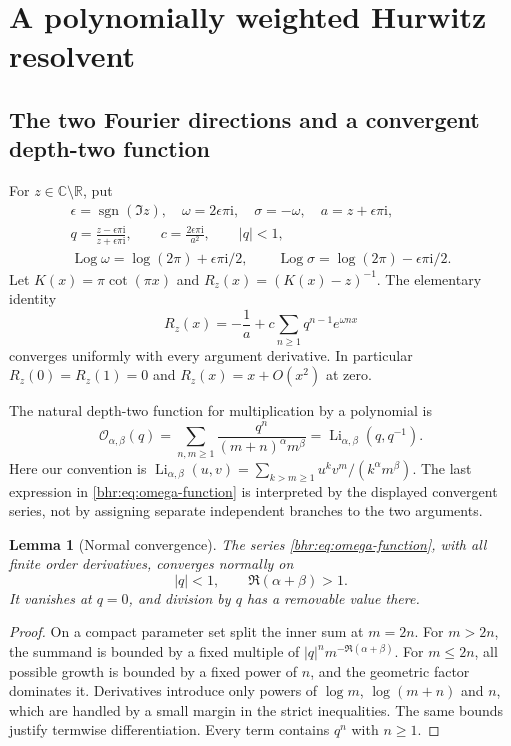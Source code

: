 \documentclass[11pt]{article}
\numberwithin{equation}{section}
\theoremstyle{plain}
\newtheorem{lemma}[theorem]{Lemma}
\theoremstyle{definition}
\theoremstyle{remark}
\DeclareMathOperator{\Li}{Li}
\DeclareMathOperator{\Log}{Log}
\DeclareMathOperator{\sgn}{sgn}
\newcommand{\C}{\mathbb C}
\newcommand{\R}{\mathbb R}
\newcommand{\ii}{\mathrm i}
\begin{document}


\section{A polynomially weighted Hurwitz resolvent}
\label{bhr:sec:weighted}

\subsection{The two Fourier directions and a convergent depth-two function}

For $z\in\C\setminus\R$, put
\begin{equation}\label{bhr:eq:coordinates}
 \begin{gathered}
 \epsilon=\sgn(\Im z),\quad \omega=2\epsilon\pi\ii,
 \quad \sigma=-\omega,\quad a=z+\epsilon\pi\ii,\\
 q=\frac{z-\epsilon\pi\ii}{z+\epsilon\pi\ii},\qquad
 c=\frac{2\epsilon\pi\ii}{a^2},\qquad |q|<1,\\
 \Log\omega=\log(2\pi)+\epsilon\pi\ii/2,\qquad
 \Log\sigma=\log(2\pi)-\epsilon\pi\ii/2.
 \end{gathered}
\end{equation}
Let $K(x)=\pi\cot(\pi x)$ and $R_z(x)=(K(x)-z)^{-1}$.
The elementary identity
\begin{equation}\label{bhr:eq:resolvent-fourier}
 R_z(x)=-\frac1a+c\sum_{n\ge1}q^{n-1}e^{\omega nx}
\end{equation}
converges uniformly with every argument derivative. In particular
$R_z(0)=R_z(1)=0$ and $R_z(x)=x+O(x^2)$ at zero.

The natural depth-two function for multiplication by a polynomial is
\begin{equation}\label{bhr:eq:omega-function}
 \mathcal O_{\alpha,\beta}(q)
   =\sum_{n,m\ge1}\frac{q^n}{(m+n)^\alpha m^\beta}
   =\Li_{\alpha,\beta}(q,q^{-1}).
\end{equation}
Here our convention is
$\Li_{\alpha,\beta}(u,v)=\sum_{k>m\ge1}
u^kv^m/(k^\alpha m^\beta)$.
The last expression in \eqref{bhr:eq:omega-function} is interpreted by
the displayed convergent series, not by assigning separate
independent branches to the two arguments.

\begin{lemma}[Normal convergence]\label{bhr:lem:omega-normal}
The series \eqref{bhr:eq:omega-function}, with all finite order
derivatives, converges normally on
\[
 |q|<1,\qquad \Re(\alpha+\beta)>1.
\]
It vanishes at $q=0$, and division by $q$ has a removable value there.
\end{lemma}
\begin{proof}
On a compact parameter set split the inner sum at $m=2n$.
For $m>2n$, the summand is bounded by a fixed multiple of
$|q|^n m^{-\Re(\alpha+\beta)}$. For $m\le2n$, all possible
growth is bounded by a fixed power of $n$, and the geometric
factor dominates it. Derivatives introduce only powers of
$\log m$, $\log(m+n)$ and $n$, which are handled by a small
margin in the strict inequalities. The same bounds justify
termwise differentiation. Every term contains $q^n$ with $n\ge1$.
\end{proof}
\end{document}

